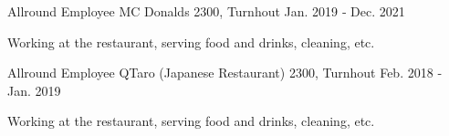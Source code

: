 \begin{cventries}
\cventry
    {Allround Employee} %
    {MC Donalds} %
    {2300, Turnhout} %
    {Jan. 2019 ‑ Dec. 2021} %
    {
        \begin{cvitems} %
            \item {Working at the restaurant, serving food and drinks, cleaning, etc.}
        \end{cvitems}
    }

\cventry
    {Allround Employee} %
    {QTaro (Japanese Restaurant)} %
    {2300, Turnhout} %
    {Feb. 2018 ‑ Jan. 2019} %
    {
        \begin{cvitems} %
            \item {Working at the restaurant, serving food and drinks, cleaning, etc.}
        \end{cvitems}
    }

\end{cventries}
